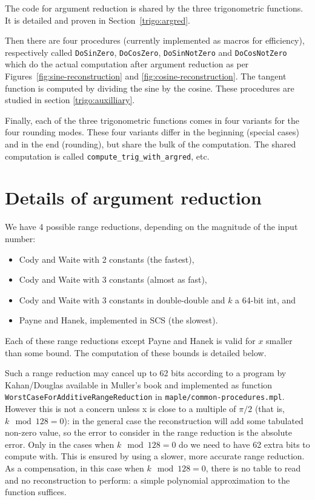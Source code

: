 The code for argument reduction is shared by the three
trigonometric functions. It is detailed and proven in
Section~\ref{trigo:argred}.

Then there are four procedures (currently implemented as macros for
efficiency), respectively called \texttt{DoSinZero},
\texttt{DoCosZero}, \texttt{DoSinNotZero} and \texttt{DoCosNotZero}
which do the actual computation after argument reduction as per
Figures~\ref{fig:sine-reconstruction} and
\ref{fig:cosine-reconstruction}. The tangent function is computed by
dividing the sine by the cosine. These procedures are studied in
section \ref{trigo:auxilliary}.

Finally, each of the three trigonometric functions comes in four
variants for the four rounding modes. These four variants differ in
the beginning (special cases) and in the end (rounding), but share the
bulk of the computation. The shared computation is called
\verb!compute_trig_with_argred!, etc.




\section{Details of argument reduction
\label{trigo:argred}}


We have 4 possible range reductions, depending on the magnitude of the input number:

\begin{itemize}
\item Cody and Waite with 2 constants (the fastest),
\item Cody and Waite with 3 constants (almost as fast),
\item Cody and Waite with 3 constants in double-double and $k$ a
  64-bit int, and 
\item Payne and Hanek, implemented in SCS (the slowest).
\end{itemize}
Each of these range reductions except Payne and Hanek is valid for $x$
smaller than some bound. The computation of these bounds is detailed
below.

Such a range reduction may cancel up to 62 bits according to a program
by Kahan/Douglas available in Muller's book \cite{Muller97} and
implemented as function \texttt{WorstCaseForAdditiveRangeReduction} in
\texttt{maple/common-procedures.mpl}.  However this is not a concern
unless x is close to a multiple of $\pi/2$ (that is, $k \mod 128=0$): in
the general case the reconstruction will add some tabulated non-zero
value, so the error to consider in the range reduction is the absolute
error.  Only in the cases when $k \mod 128=0$ do we need to have 62
extra bits to compute with. This is ensured by using a slower, more
accurate range reduction. As a compensation, in this case when $k \mod
128=0$, there is no table to read and no reconstruction to perform: a
simple polynomial approximation to the function suffices. 

